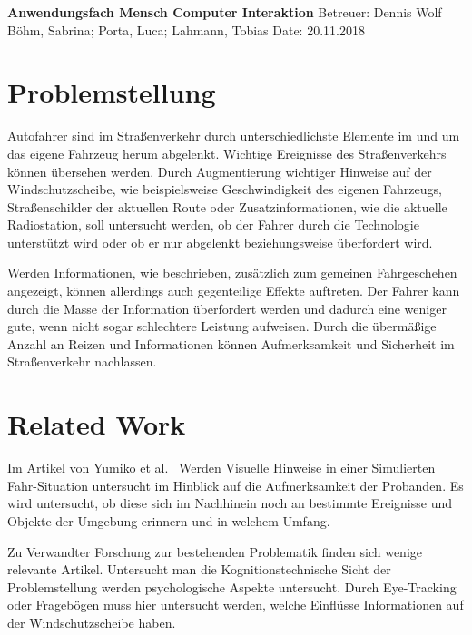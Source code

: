 \documentclass[a4paper, 11pt]{article}
\begin{document}
\noindent
\large\textbf{Anwendungsfach Mensch Computer Interaktion} \hfill Betreuer: Dennis Wolf \\
\normalsize Böhm, Sabrina; Porta, Luca; Lahmann, Tobias \hfill Date: 20.11.2018 \\


\section*{Problemstellung}
Autofahrer sind im Straßenverkehr durch unterschiedlichste Elemente im und um das eigene Fahrzeug herum abgelenkt. Wichtige Ereignisse des Straßenverkehrs können übersehen werden. Durch Augmentierung wichtiger Hinweise auf der Windschutzscheibe, wie beispielsweise Geschwindigkeit des eigenen Fahrzeugs, Straßenschilder der aktuellen Route oder Zusatzinformationen, wie die aktuelle Radiostation, soll untersucht werden, ob der Fahrer durch die Technologie unterstützt wird oder ob er nur abgelenkt beziehungsweise überfordert wird.

Werden Informationen, wie beschrieben, zusätzlich zum gemeinen Fahrgeschehen angezeigt, können allerdings auch gegenteilige Effekte auftreten. Der Fahrer kann durch die Masse der Information überfordert werden und dadurch eine weniger gute, wenn nicht sogar schlechtere Leistung aufweisen. Durch die übermäßige Anzahl an Reizen und Informationen können Aufmerksamkeit und Sicherheit im Straßenverkehr nachlassen. 

\section*{Related Work}
Im Artikel von Yumiko et al.~\cite{VisAttention} Werden Visuelle Hinweise in einer Simulierten Fahr-Situation untersucht im Hinblick auf die Aufmerksamkeit der Probanden. Es wird untersucht, ob diese sich im Nachhinein noch an bestimmte Ereignisse und Objekte der Umgebung erinnern und in welchem Umfang.

\cite{seppelt2017attend, yeh2001cueReliability, chi05bonanni, murphyChutorian2010awareness}

Zu Verwandter Forschung zur bestehenden Problematik finden sich wenige relevante Artikel. Untersucht man die Kognitionstechnische Sicht der Problemstellung werden psychologische Aspekte untersucht. Durch Eye-Tracking oder Fragebögen muss hier untersucht werden, welche Einflüsse Informationen auf der Windschutzscheibe haben.
\end{document}
